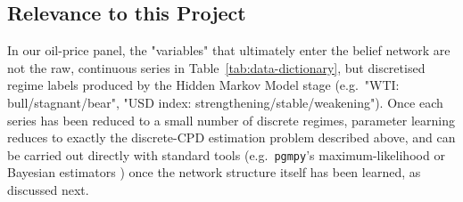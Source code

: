 \subsection{Relevance to this Project}

In our oil-price panel, the "variables" that ultimately enter the belief network are not the raw, continuous series in Table~\ref{tab:data-dictionary}, but discretised regime labels produced by the Hidden Markov Model stage (e.g.\
"WTI: bull/stagnant/bear", "USD index: strengthening/stable/weakening"). Once each series has been reduced to a small number of discrete regimes, parameter
learning reduces to exactly the discrete-CPD estimation problem described above, and can be carried out directly with standard tools (e.g.\ \texttt{pgmpy}'s
maximum-likelihood or Bayesian estimators \autocite{ankan2015pgmpy}) once the
network structure itself has been learned, as discussed next.
